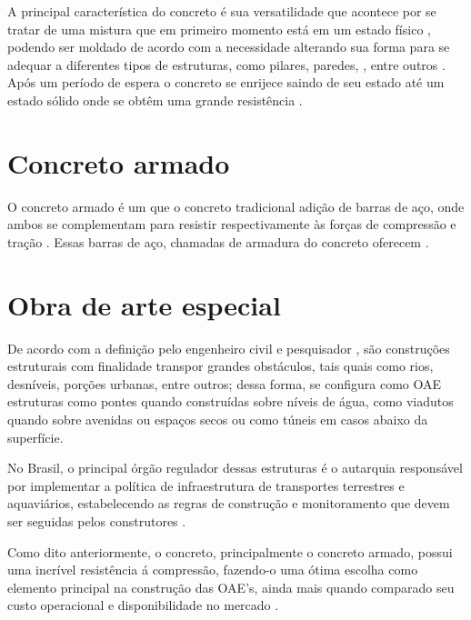 A principal característica do concreto é sua versatilidade que acontece por se tratar de uma mistura que em primeiro momento está em um estado físico , podendo ser moldado de acordo com a necessidade alterando sua forma para se adequar a diferentes tipos de estruturas, como pilares, paredes, , entre outros \cite{Gagg2014}. Após um período de espera o concreto se enrijece saindo de seu estado  até um estado sólido onde se obtêm uma grande resistência .


\section{Concreto armado}

O concreto armado é um  que  o concreto tradicional  adição de barras de aço, onde ambos se complementam para resistir respectivamente às forças de compressão e tração \cite{Lima2014}. 
Essas barras de aço, chamadas de armadura do concreto oferecem  \cite{pinheiro2010estruturas}.

\section{Obra de arte especial}

De acordo com a definição pelo engenheiro civil e pesquisador ,  são construções estruturais com finalidade transpor grandes obstáculos, tais quais como rios, desníveis, porções urbanas, entre outros; dessa forma, se configura como OAE estruturas como pontes quando construídas sobre níveis de água, como viadutos quando sobre avenidas ou espaços secos ou como túneis em casos abaixo da superfície.

No Brasil, o principal órgão regulador dessas estruturas  é o  autarquia responsável por implementar a política de infraestrutura de transportes terrestres e aquaviários,
estabelecendo as regras de construção e monitoramento que devem ser seguidas pelos construtores \cite{dnitdados}.

Como dito anteriormente, o concreto, principalmente o concreto armado, possui uma incrível resistência á compressão, fazendo-o uma ótima escolha como elemento principal na construção das OAE's, ainda mais quando comparado seu custo operacional e disponibilidade no mercado \cite{santos2008armaccao}. 

